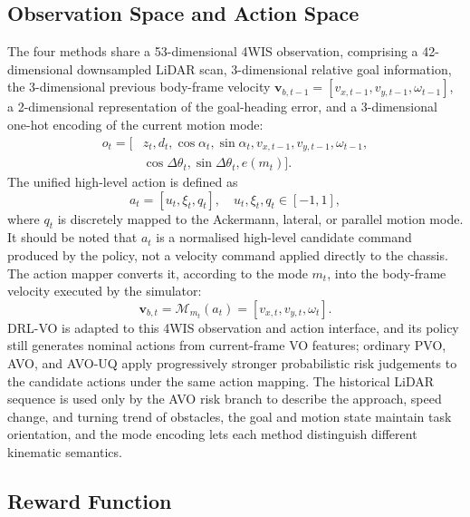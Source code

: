 \documentclass[10pt,a4paper,twocolumn]{article}
\begin{document}
\subsection{Observation Space and Action Space}

The four methods share a 53-dimensional 4WIS observation, comprising a 42-dimensional downsampled LiDAR scan, 3-dimensional relative goal information, the 3-dimensional previous body-frame velocity $\mathbf v_{b,t-1}=[v_{x,t-1},v_{y,t-1},\omega_{t-1}]$, a 2-dimensional representation of the goal-heading error, and a 3-dimensional one-hot encoding of the current motion mode:
\begin{equation}
\begin{aligned}
    o_t=[&z_t,d_t,\cos\alpha_t,\sin\alpha_t,v_{x,t-1},v_{y,t-1},\omega_{t-1},\\
    &\cos\Delta\theta_t,\sin\Delta\theta_t,e(m_t)].
\end{aligned}
\end{equation}
The unified high-level action is defined as
\begin{equation}
    a_t=[u_t,\xi_t,q_t], \quad u_t,\xi_t,q_t\in[-1,1],
\end{equation}
where $q_t$ is discretely mapped to the Ackermann, lateral, or parallel motion mode. It should be noted that $a_t$ is a normalised high-level candidate command produced by the policy, not a velocity command applied directly to the chassis. The action mapper converts it, according to the mode $m_t$, into the body-frame velocity executed by the simulator:
\begin{equation}
    \mathbf v_{b,t}=\mathcal M_{m_t}(a_t)=[v_{x,t},v_{y,t},\omega_t].
    \label{eq:action_mapping}
\end{equation}
DRL-VO is adapted to this 4WIS observation and action interface, and its policy still generates nominal actions from current-frame VO features; ordinary PVO, AVO, and AVO-UQ apply progressively stronger probabilistic risk judgements to the candidate actions under the same action mapping. The historical LiDAR sequence is used only by the AVO risk branch to describe the approach, speed change, and turning trend of obstacles, the goal and motion state maintain task orientation, and the mode encoding lets each method distinguish different kinematic semantics.

\subsection{Reward Function}
\end{document}

